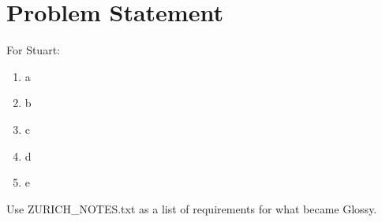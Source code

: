 \documentclass[11pt, oneside]{report}
\begin{document}


\section{Problem Statement}
\label{sec:introduction:problem:statement}

For Stuart:

\begin{enumerate}
\item a 
\item b
\item c
\item d 
\item e
\end{enumerate}


Use ZURICH\_NOTES.txt as a list of requirements for what became Glossy.

\end{document}

